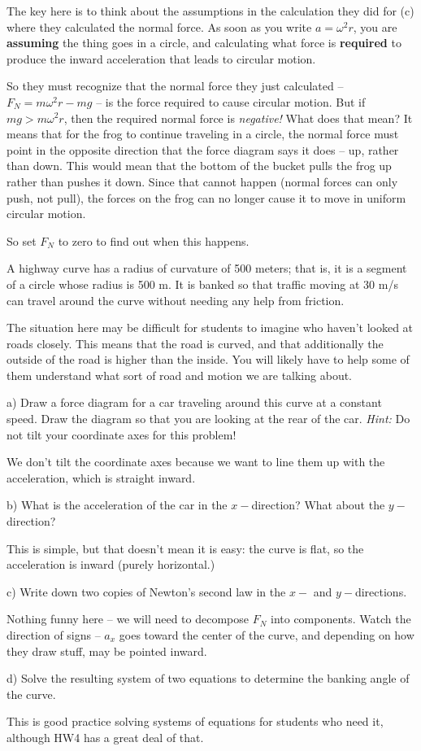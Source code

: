 \documentclass[12pt]{article}
\begin{document}
{\color{Red}
	
	The key here is to think about the assumptions in the calculation they did for (c) where they calculated the normal force. As soon as you write $a = \omega^2 r$, you are {\bf assuming} the thing goes in a circle, and calculating what force is {\bf required} to produce the inward acceleration that leads to circular motion. 
	
	So they must recognize that the normal force they just calculated -- $F_N = m\omega^2 r - mg$ -- is the force required to cause circular motion. But if $mg > m\omega^2 r$, then the required normal force is {\it negative!} What does that mean? It means that for the frog to continue traveling in a circle, the normal force must point in the opposite direction that the force diagram says it does -- up, rather than down. This would mean that the bottom of the bucket pulls the frog up rather than pushes it down. Since that cannot happen (normal forces can only push, not pull), the forces on the frog can no longer cause it to move in uniform circular motion.
	
	So set $F_N$ to zero to find out when this happens.
}

\newpage


A highway curve has a radius of curvature of 500 meters; that is, it is a segment of a circle whose radius is 500 m. It is banked so that traffic moving at 30 m/s can travel
around the curve without needing any help from friction.


{\color{Red}
	The situation here may be difficult for students to imagine who haven't looked at roads closely. This means that the road is curved, and that additionally the outside of the road is higher than the inside. You will likely have to help some of them understand what sort of road and motion we are talking about.}

a) Draw a force diagram for a car traveling around this curve at a constant speed. Draw the diagram so that you are looking at the rear of the car. {\it Hint:} Do not tilt your coordinate axes for this problem!

{\color{Red}We don't tilt the coordinate axes because we want to line them up with the acceleration, which is straight inward.}



b) What is the acceleration of the car in the $x-$direction? What about the $y-$direction?

{\color{Red} This is simple, but that doesn't mean it is easy: the curve is flat, so the acceleration is inward (purely horizontal.)}
	
	
c) Write down two copies of Newton's second law in the $x-$ and $y-$directions.

{\color{Red} Nothing funny here -- we will need to decompose $F_N$ into components. Watch the direction of signs -- $a_x$ goes toward the center of the curve, and depending on how they draw stuff, may be pointed inward.}

d) Solve the resulting system of two equations to determine the banking angle of the curve.

{\color{Red} This is good practice solving systems of equations for students who need it, although HW4 has a great deal of that.}
\end{document}
